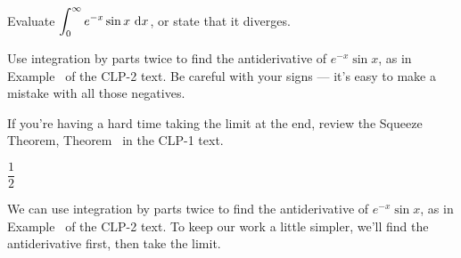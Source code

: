 \begin{Mquestion}
Evaluate $\displaystyle\int_0^\infty e^{-x}\sin x~\mathrm{d}x$, or state that it diverges.
\end{Mquestion}
\begin{hint}
Use integration by parts twice to find the antiderivative of $e^{-x}\sin x$, as in Example~ of the CLP-2 text. Be careful with your signs ---
it's easy to make a mistake with all those negatives.

If you're having a hard time taking the limit at the end, review the Squeeze Theorem, Theorem~ in the CLP-1 text.
\end{hint}
\begin{answer}
$\dfrac{1}{2}$
\end{answer}
\begin{solution}
We can use integration by parts twice to find the antiderivative of $e^{-x}\sin x$, as in Example~ of the CLP-2 text. To keep our work a little simpler, we'll find the antiderivative first, then take the limit.


\end{solution}
